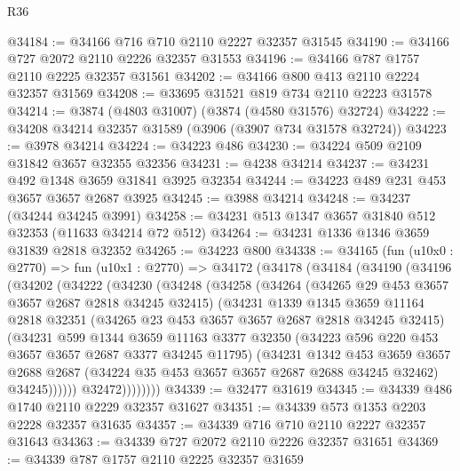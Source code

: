 \begin{lexlean}{R36}
\begin{coremodule}
@34184 := @34166 @716 @710 @2110 @2227 @32357 @31545
@34190 := @34166 @727 @2072 @2110 @2226 @32357 @31553
@34196 := @34166 @787 @1757 @2110 @2225 @32357 @31561
@34202 := @34166 @800 @413 @2110 @2224 @32357 @31569
@34208 := @33695 @31521 @819 @734 @2110 @2223 @31578
@34214 := @3874 (@4803 @31007) (@3874 (@4580 @31576) @32724)
@34222 := @34208 @34214 @32357 @31589 (@3906 (@3907 @734 @31578 @32724))
@34223 := @3978 @34214
@34224 := @34223 @486
@34230 := @34224 @509 @2109 @31842 @3657 @32355 @32356
@34231 := @4238 @34214
@34237 := @34231 @492 @1348 @3659 @31841 @3925 @32354
@34244 := @34223 @489 @231 @453 @3657 @3657 @2687 @3925
@34245 := @3988 @34214
@34248 := @34237 (@34244 @34245 @3991)
@34258 := @34231 @513 @1347 @3657 @31840 @512 @32353 (@11633 @34214 @72 @512)
@34264 := @34231 @1336 @1346 @3659 @31839 @2818 @32352
@34265 := @34223 @800
@34338 := @34165
    (fun (u10x0 : @2770) =>
    fun (u10x1 : @2770) =>
    @34172
      (@34178
        (@34184
          (@34190
            (@34196
              (@34202
                (@34222
                  (@34230
                    (@34248
                      (@34258
                        (@34264
                          (@34265 @29 @453 @3657 @3657 @2687 @2818 @34245 @32415)
                          (@34231
                            @1339
                            @1345
                            @3659
                            @11164
                            @2818
                            @32351
                            (@34265 @23 @453 @3657 @3657 @2687 @2818 @34245 @32415)
                            (@34231
                              @599
                              @1344
                              @3659
                              @11163
                              @3377
                              @32350
                              (@34223 @596 @220 @453 @3657 @3657 @2687 @3377 @34245 @11795)
                              (@34231
                                @1342
                                @453
                                @3659
                                @3657
                                @2688
                                @2687
                                (@34224 @35 @453 @3657 @3657 @2687 @2688 @34245 @32462)
                                @34245))))))
                    @32472))))))))
@34339 := @32477 @31619
@34345 := @34339 @486 @1740 @2110 @2229 @32357 @31627
@34351 := @34339 @573 @1353 @2203 @2228 @32357 @31635
@34357 := @34339 @716 @710 @2110 @2227 @32357 @31643
@34363 := @34339 @727 @2072 @2110 @2226 @32357 @31651
@34369 := @34339 @787 @1757 @2110 @2225 @32357 @31659

\end{coremodule}
\end{lexlean}
